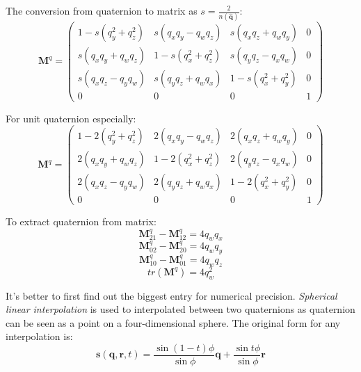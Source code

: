 \documentclass[10pt, a4paper]{article}
\begin{document}
                The conversion from quaternion to matrix as $s = \frac{2}{n(\hat{\textbf{q}})}$:
                    \begin{equation*}
                        \textbf{M}^q = 
                        \begin{pmatrix}
                            1 - s(q_y^2 + q_z^2) & s(q_xq_y - q_wq_z) & s(q_xq_z + q_wq_y) & 0\\
                            s(q_xq_y + q_wq_z) & 1 - s(q_x^2 + q_z^2) & s(q_yq_z - q_xq_w) & 0\\
                            s(q_xq_z - q_yq_w) & s(q_yq_z + q_wq_x) & 1 - s(q_x^2 + q_y^2) & 0\\
                            0 & 0 & 0 & 1
                        \end{pmatrix}
                    \end{equation*}
                
                For unit quaternion especially: 
                \begin{equation*}
                    \textbf{M}^q = 
                    \begin{pmatrix}
                        1 - 2(q_y^2 + q_z^2) & 2(q_xq_y - q_wq_z) & 2(q_xq_z + q_wq_y) & 0\\
                        2(q_xq_y + q_wq_z) & 1 - 2(q_x^2 + q_z^2) & 2(q_yq_z - q_xq_w) & 0\\
                        2(q_xq_z - q_yq_w) & 2(q_yq_z + q_wq_x) & 1 - 2(q_x^2 + q_y^2) & 0\\
                        0 & 0 & 0 & 1
                    \end{pmatrix}
                \end{equation*}

                To extract quaternion from matrix:
                $$\textbf{M}_{21}^q - \textbf{M}_{12}^q = 4q_wq_x$$
                $$\textbf{M}_{02}^q - \textbf{M}_{20}^q = 4q_wq_y$$
                $$\textbf{M}_{10}^q - \textbf{M}_{01}^q = 4q_wq_z$$
                $$tr(\textbf{M}^q) = 4q_w^2$$
                
                It's better to first find out the biggest entry for numerical precision.
                \newpage
                \emph{Spherical linear interpolation} is used to interpolated between two quaternions as quaternion can be seen as a point on a four-dimensional sphere. The original form for any interpolation is:
                $$\textbf{s}(\textbf{q}, \textbf{r}, t) = \frac{\sin{(1 - t)\phi}}{\sin{\phi}}\textbf{q} + \frac{\sin{t\phi}}{\sin{\phi}}\textbf{r}$$
\end{document}
